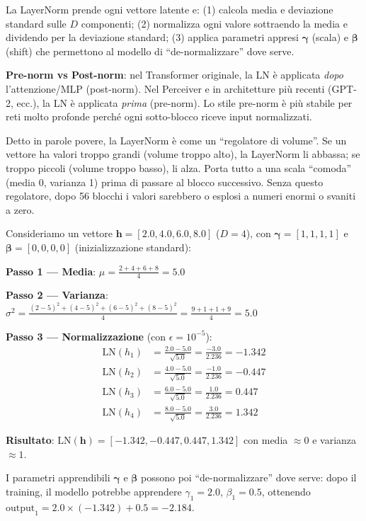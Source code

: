 \documentclass[12pt,a4paper]{article}
\begin{document}
La LayerNorm prende ogni vettore latente e: (1) calcola media e deviazione standard sulle $D$ componenti; (2) normalizza ogni valore sottraendo la media e dividendo per la deviazione standard; (3) applica parametri appresi $\boldsymbol{\gamma}$ (scala) e $\boldsymbol{\beta}$ (shift) che permettono al modello di ``de-normalizzare'' dove serve.

\textbf{Pre-norm vs Post-norm}: nel Transformer originale, la LN \`e applicata \emph{dopo} l'attenzione/MLP (post-norm). Nel Perceiver e in architetture pi\`u recenti (GPT-2, ecc.), la LN \`e applicata \emph{prima} (pre-norm). Lo stile pre-norm \`e pi\`u stabile per reti molto profonde perch\'e ogni sotto-blocco riceve input normalizzati.

\begin{notabox}
Detto in parole povere, la LayerNorm \`e come un ``regolatore di volume''. Se un vettore ha valori troppo grandi (volume troppo alto), la LayerNorm li abbassa; se troppo piccoli (volume troppo basso), li alza. Porta tutto a una scala ``comoda'' (media 0, varianza 1) prima di passare al blocco successivo. Senza questo regolatore, dopo 56 blocchi i valori sarebbero o esplosi a numeri enormi o svaniti a zero.
\end{notabox}

\begin{examplebox}
Consideriamo un vettore $\mathbf{h} = [2.0, 4.0, 6.0, 8.0]$ ($D = 4$), con $\boldsymbol{\gamma} = [1, 1, 1, 1]$ e $\boldsymbol{\beta} = [0, 0, 0, 0]$ (inizializzazione standard):

\textbf{Passo 1 --- Media}: $\mu = \frac{2 + 4 + 6 + 8}{4} = 5.0$

\textbf{Passo 2 --- Varianza}: $\sigma^2 = \frac{(2-5)^2 + (4-5)^2 + (6-5)^2 + (8-5)^2}{4} = \frac{9 + 1 + 1 + 9}{4} = 5.0$

\textbf{Passo 3 --- Normalizzazione} (con $\epsilon = 10^{-5}$):
\begin{align*}
    \text{LN}(h_1) &= \frac{2.0 - 5.0}{\sqrt{5.0}} = \frac{-3.0}{2.236} = -1.342 \\
    \text{LN}(h_2) &= \frac{4.0 - 5.0}{\sqrt{5.0}} = \frac{-1.0}{2.236} = -0.447 \\
    \text{LN}(h_3) &= \frac{6.0 - 5.0}{\sqrt{5.0}} = \frac{1.0}{2.236} = 0.447 \\
    \text{LN}(h_4) &= \frac{8.0 - 5.0}{\sqrt{5.0}} = \frac{3.0}{2.236} = 1.342
\end{align*}

\textbf{Risultato}: $\text{LN}(\mathbf{h}) = [-1.342, -0.447, 0.447, 1.342]$ con media $\approx 0$ e varianza $\approx 1$.

I parametri apprendibili $\boldsymbol{\gamma}$ e $\boldsymbol{\beta}$ possono poi ``de-normalizzare'' dove serve: dopo il training, il modello potrebbe apprendere $\gamma_1 = 2.0$, $\beta_1 = 0.5$, ottenendo $\text{output}_1 = 2.0 \times (-1.342) + 0.5 = -2.184$.
\end{examplebox}
\end{document}
